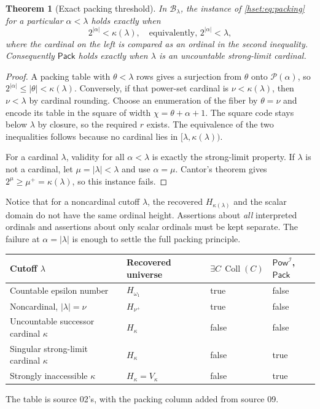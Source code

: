 \documentclass[11pt,letterpaper]{article}
\newtheorem{theorem}{Theorem}[section]
\theoremstyle{definition}
\theoremstyle{remark}
\newcommand{\B}{\mathcal B}
\newcommand{\I}{\mathcal I}
\newcommand{\Coll}{\operatorname{Coll}}
\newcommand{\Pack}{\mathsf{Pack}}
\newcommand{\PowI}{\mathsf{Pow}^{\I}}
\newcommand{\Pow}{\mathcal P}
\newcommand{\card}[1]{\lvert#1\rvert}
\begin{document}
\begin{theorem}[Exact packing threshold]
\label{hset:thm:packing}
In $\B_\lambda$, the instance of \eqref{hset:eq:packing} for a particular
$\alpha<\lambda$ holds exactly when
\[
 2^{\card\alpha}<\kappa(\lambda),
 \quad\text{equivalently, }2^{\card\alpha}<\lambda,
\]
where the cardinal on the left is compared as an ordinal in the second
inequality. Consequently $\Pack$ holds exactly when $\lambda$ is an
uncountable strong-limit cardinal.
\end{theorem}
\begin{proof}
A packing table with $\theta<\lambda$ rows gives a surjection from $\theta$
onto $\Pow(\alpha)$, so $2^{\card\alpha}\le\card\theta<\kappa(\lambda)$.
Conversely, if that power-set cardinal is $\nu<\kappa(\lambda)$, then
$\nu<\lambda$ by cardinal rounding. Choose an enumeration of the fiber by
$\theta=\nu$ and encode its table in the square of width
$\chi=\theta+\alpha+1$. The square code stays below $\lambda$ by closure,
so the required $r$ exists. The equivalence of the two inequalities follows
because no cardinal lies in $[\lambda,\kappa(\lambda))$.

For a cardinal $\lambda$, validity for all $\alpha<\lambda$ is exactly the
strong-limit property. If $\lambda$ is not a cardinal, let
$\mu=\card\lambda<\lambda$ and use $\alpha=\mu$. Cantor's theorem gives
$2^\mu\ge\mu^+=\kappa(\lambda)$, so this instance fails.
\end{proof}

Notice that for a noncardinal cutoff $\lambda$, the recovered
$H_{\kappa(\lambda)}$ and the scalar domain do not have the same ordinal
height. Assertions about \emph{all} interpreted ordinals and assertions
about only scalar ordinals must be kept separate. The failure at
$\alpha=\card\lambda$ is enough to settle the full packing principle.

\begin{center}\small
\begin{tabular}{@{}P{0.3\textwidth}P{0.2\textwidth}P{0.14\textwidth}P{0.14\textwidth}@{}}
\toprule
Cutoff $\lambda$ & Recovered universe & $\exists C\,\Coll(C)$ & $\PowI$, $\Pack$\\
\midrule
Countable epsilon number & $H_{\omega_1}$ & true & false\\
Noncardinal, $\card\lambda=\nu$ & $H_{\nu^+}$ & true & false\\
Uncountable successor cardinal $\kappa$ & $H_\kappa$ & false & false\\
Singular strong-limit cardinal $\kappa$ & $H_\kappa$ & false & true\\
Strongly inaccessible $\kappa$ & $H_\kappa=V_\kappa$ & false & true\\
\bottomrule
\end{tabular}
\end{center}
The table is source 02's, with the packing column added from source 09.
\end{document}
